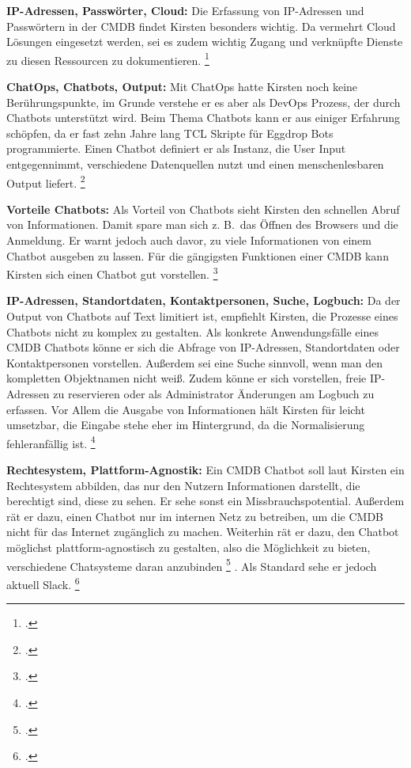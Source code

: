 \textbf{IP-Adressen, Passwörter, Cloud: }Die Erfassung von IP-Adressen und Passwörtern in der \acs{CMDB} findet Kirsten besonders wichtig. Da vermehrt Cloud Lösungen eingesetzt werden, sei es zudem wichtig Zugang und verknüpfte Dienste zu diesen Ressourcen zu dokumentieren.
\footcite[Vgl.][o. \pno]{Kirsten_2019}

\textbf{ChatOps, Chatbots, Output: }Mit ChatOps hatte Kirsten noch keine Berührungspunkte, im Grunde verstehe er es aber als DevOps Prozess, der durch Chatbots unterstützt wird.  Beim Thema Chatbots kann er aus einiger Erfahrung schöpfen, da er fast zehn Jahre lang TCL Skripte für Eggdrop Bots programmierte. Einen Chatbot definiert er als Instanz, die User Input entgegennimmt, verschiedene Datenquellen nutzt und einen menschenlesbaren Output liefert.
\footcite[Vgl.][o. \pno]{Kirsten_2019}

\textbf{Vorteile Chatbots: }Als Vorteil von Chatbots sieht Kirsten den schnellen Abruf von Informationen. Damit spare man sich z. B.~das Öffnen des Browsers und die Anmeldung. Er warnt jedoch auch davor, zu viele Informationen von einem Chatbot ausgeben zu lassen. Für die gängigsten Funktionen einer \acs{CMDB} kann Kirsten sich einen Chatbot gut vorstellen. 
\footcite[Vgl.][o. \pno]{Kirsten_2019}

\textbf{IP-Adressen, Standortdaten, Kontaktpersonen, Suche, Logbuch: }Da der Output von Chatbots auf Text limitiert ist, empfiehlt Kirsten, die Prozesse eines Chatbots nicht zu komplex zu gestalten. Als konkrete Anwendungsfälle eines \acs{CMDB} Chatbots könne er sich die Abfrage von IP-Adressen, Standortdaten oder Kontaktpersonen vorstellen. Außerdem sei eine Suche sinnvoll, wenn man den kompletten Objektnamen nicht weiß. Zudem könne er sich vorstellen, freie IP-Adressen zu reservieren oder als Administrator Änderungen am Logbuch zu erfassen. Vor Allem die Ausgabe von Informationen hält Kirsten für leicht umsetzbar, die Eingabe stehe eher im Hintergrund, da die Normalisierung fehleranfällig ist.
\footcite[Vgl.][o. \pno]{Kirsten_2019}

\textbf{Rechtesystem, Plattform-Agnostik: }Ein \acs{CMDB} Chatbot soll laut Kirsten ein Rechtesystem abbilden, das nur den Nutzern Informationen darstellt, die berechtigt sind, diese zu sehen. Er sehe sonst ein Missbrauchspotential. Außerdem rät er dazu, einen Chatbot nur im internen Netz zu betreiben, um die \acs{CMDB} nicht für das Internet zugänglich zu machen. Weiterhin rät er dazu, den Chatbot möglichst plattform-agnostisch zu gestalten, also die Möglichkeit zu bieten, \glqq{}verschiedene Chatsysteme daran anzubinden\grqq
\footcite[][o. \pno]{Kirsten_2019}
. Als Standard sehe er jedoch aktuell Slack.
\footcite[Vgl.][o. \pno]{Kirsten_2019}

